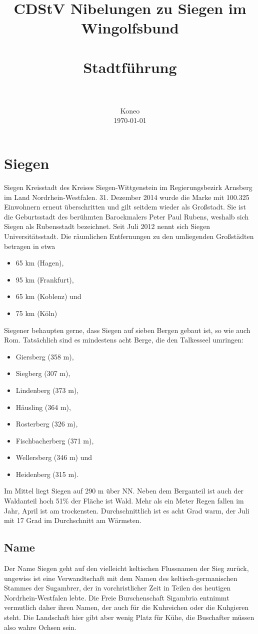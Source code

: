 \documentclass[paper=a4, fontsize=11pt]{scrartcl} %
\title{
		\usefont{OT1}{bch}{b}{n}
		\normalfont \normalsize CDStV Nibelungen zu Siegen im Wingolfsbund \\ [25pt]
		\horrule{0.5pt} \\[0.4cm]
		\huge Stadtführung \\
		\horrule{2pt} \\[0.5cm]
}
\author{
		\normalfont 				\normalsize
        Koneo\\[-3pt]				\normalsize
        \today
}
\date{}
\numberwithin{equation}{section}		%
\numberwithin{figure}{section}			%
\numberwithin{table}{section}			%
\begin{document}
\maketitle
\section{Siegen}
Siegen Kreisstadt des Kreises Siegen-Wittgenstein im Regierungsbezirk Arnsberg im Land Nordrhein-Westfalen. 31. Dezember 2014 wurde die Marke mit 100.325 Einwohnern erneut überschritten und gilt seitdem wieder als Großstadt. Sie ist die Geburtsstadt des berühmten Barockmalers Peter Paul Rubens, weshalb sich Siegen als Rubensstadt bezeichnet. Seit Juli 2012 nennt sich Siegen Universitätsstadt.
Die räumlichen Entfernungen zu den umliegenden Großstädten betragen in etwa 
\begin{itemize}\setlength\itemsep{0pt}
	\item 65 km (Hagen), 
	\item 95 km (Frankfurt), 
	\item 65 km (Koblenz) und 
	\item 75 km (Köln)
\end{itemize}
Siegener behaupten gerne, dass Siegen auf sieben Bergen gebaut ist, so wie auch Rom. Tatsächlich sind es mindestens acht Berge, die den Talkesseel umringen:
\begin{itemize}\setlength\itemsep{0pt}
	\item Giersberg (358 m), 
	\item Siegberg (307 m),
	\item Lindenberg (373 m),
	\item Häusling (364 m), 
	\item Rosterberg (326 m),
	\item Fischbacherberg (371 m), 
	\item Wellersberg (346 m) und 
	\item Heidenberg (315 m). 
\end{itemize}
 Im Mittel liegt Siegen auf 290 m über NN. Neben dem Berganteil ist auch der Waldanteil hoch 51\% der Fläche ist Wald. Mehr als ein Meter Regen fallen im Jahr, April ist am trockensten. Durchschnittlich ist es acht Grad warm, der Juli mit 17 Grad im Durchschnitt am Wärmsten.
 
 \subsection{Name}
 Der Name Siegen geht auf den vielleicht keltischen Flussnamen der Sieg zurück, ungewiss ist eine Verwandtschaft mit dem Namen des keltisch-germanischen Stammes der Sugambrer, der in vorchristlicher Zeit in Teilen des heutigen Nordrhein-Westfalen lebte. Die Freie Burschenschaft Sigambria entnimmt vermutlich daher ihren Namen, der auch für die Kuhreichen oder die Kuhgieren steht. Die Landschaft hier gibt aber wenig Platz für Kühe, die Buschafter müssen also wahre Ochsen sein.\par 
 
\end{document}
